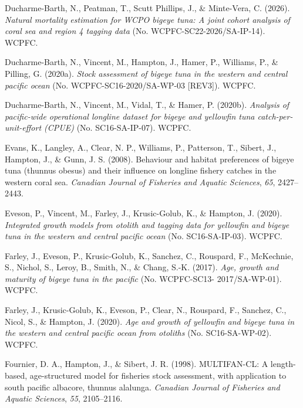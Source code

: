 \documentclass[
  english,
  a4paper,
  a4paper,
  11pt]{SCreport}
\newlength{\cslhangindent}
\newenvironment{CSLReferences}[2] %
 {\begin{list}{}{%
  \setlength{\itemindent}{0pt}
  \setlength{\leftmargin}{0pt}
  \setlength{\parsep}{0pt}
  \ifodd #1
   \setlength{\leftmargin}{\cslhangindent}
   \setlength{\itemindent}{-1\cslhangindent}
  \fi
  \setlength{\itemsep}{#2\baselineskip}}}
 {\end{list}}
\begin{document}
\begin{CSLReferences}{1}{0}
Ducharme-Barth, N., Peatman, T., Scutt Phillips, J., \& Minte-Vera, C.
(2026). \emph{Natural mortality estimation for {WCPO} bigeye tuna: A
joint cohort analysis of coral sea and region 4 tagging data} (No.
{WCPFC}-{SC}22-2026/{SA}-{IP}-14). WCPFC.

Ducharme-Barth, N., Vincent, M., Hampton, J., Hamer, P., Williams, P.,
\& Pilling, G. (2020a). \emph{Stock assessment of bigeye tuna in the
western and central pacific ocean} (No. {WCPFC}-{SC}16-2020/{SA}-{WP}-03
{[}{REV}3{]}). WCPFC.

Ducharme-Barth, N., Vincent, M., Vidal, T., \& Hamer, P. (2020b).
\emph{Analysis of pacific-wide operational longline dataset for bigeye
and yellowfin tuna catch-per-unit-effort ({CPUE})} (No.
{SC}16-{SA}-{IP}-07). WCPFC.

Evans, K., Langley, A., Clear, N. P., Williams, P., Patterson, T.,
Sibert, J., Hampton, J., \& Gunn, J. S. (2008). Behaviour and habitat
preferences of bigeye tuna (thunnus obesus) and their influence on
longline fishery catches in the western coral sea. \emph{Canadian
Journal of Fisheries and Aquatic Sciences}, \emph{65}, 2427--2443.

Eveson, P., Vincent, M., Farley, J., Krusic-Golub, K., \& Hampton, J.
(2020). \emph{Integrated growth models from otolith and tagging data for
yellowfin and bigeye tuna in the western and central pacific ocean} (No.
{SC}16-{SA}-{IP}-03). WCPFC.

Farley, J., Eveson, P., Krusic-Golub, K., Sanchez, C., Rouspard, F.,
McKechnie, S., Nichol, S., Leroy, B., Smith, N., \& Chang, S.-K. (2017).
\emph{Age, growth and maturity of bigeye tuna in the pacific} (No.
{WCPFC}-{SC}13- 2017/{SA}-{WP}-01). WCPFC.

Farley, J., Krusic-Golub, K., Eveson, P., Clear, N., Rouspard, F.,
Sanchez, C., Nicol, S., \& Hampton, J. (2020). \emph{Age and growth of
yellowfin and bigeye tuna in the western and central pacific ocean from
otoliths} (No. {SC}16-{SA}-{WP}-02). WCPFC.

Fournier, D. A., Hampton, J., \& Sibert, J. R. (1998). {MULTIFAN}-{CL}:
A length-based, age-structured model for fisheries stock assessment,
with application to south pacific albacore, thunnus alalunga.
\emph{Canadian Journal of Fisheries and Aquatic Sciences}, \emph{55},
2105--2116.


\end{CSLReferences}
\end{document}
